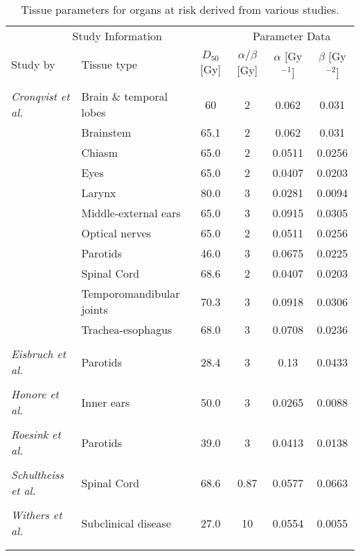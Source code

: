 \begin{table}[tb]
\centering
\footnotesize
\begin{tabular}{llcccc}
\toprule
\multicolumn{3}{c}{Study Information} & \multicolumn{3}{c}{Parameter Data} \\
\cmidrule(r){1-3} \cmidrule(r){4-6}
Study by & Tissue type & $D_{50}$ [Gy]& $\alpha/\beta$ [Gy] & $\alpha$ [Gy$^{-1}$] & $\beta$ [Gy$^{-2}$]\\
\midrule\\
\textit{Cronqvist et al.}\cite{CronqvistThesis}& Brain \& temporal lobes&60 & 2 & 0.062 & 0.031\\
& Brainstem & 65.1 & 2 & 0.062 & 0.031\\
& Chiasm & 65.0 & 2 & 0.0511 & 0.0256\\
& Eyes & 65.0 & 2 & 0.0407 & 0.0203\\
& Larynx & 80.0 & 3 & 0.0281 & 0.0094\\
& Middle-external ears & 65.0 & 3 & 0.0915 & 0.0305\\
& Optical nerves & 65.0 & 2 & 0.0511 & 0.0256\\
& Parotids & 46.0 & 3 & 0.0675 & 0.0225\\
& Spinal Cord & 68.6 & 2 & 0.0407 & 0.0203\\
& Temporomandibular joints & 70.3 & 3 & 0.0918 & 0.0306\\
& Trachea-esophagus & 68.0 & 3 & 0.0708 & 0.0236\\\\
\textit{Eisbruch et al.}\cite{pmid10524409}& Parotids & 28.4 & 3 & 0.13 & 0.0433\\\\
\textit{Honore et al.}\cite{pmid12413669}& Inner ears & 50.0 & 3 & 0.0265 & 0.0088\\\\
\textit{Roesink et al.}\cite{pmid11704314}& Parotids & 39.0 &3 & 0.0413 & 0.0138\\\\
\textit{Schultheiss et al.}\cite{pmid18243570}& Spinal Cord & 68.6 &0.87 & 0.0577 & 0.0663\\\\
\textit{Withers et al.}\cite{pmid7836089}& Subclinical disease & 27.0 & 10 & 0.0554 & 0.0055\\\\
\bottomrule\\
\end{tabular}
\caption{Tissue parameters for organs at risk derived from various studies. }
\label{tab:oartissueparameter}
\end{table}
